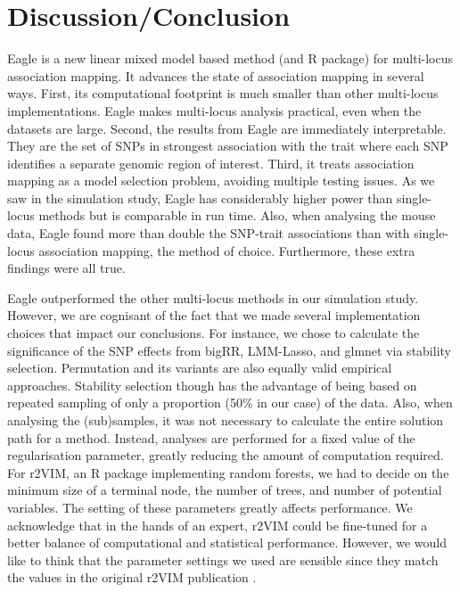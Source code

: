 \documentclass{article}
\begin{document}
\section{Discussion/Conclusion}
Eagle is a new linear mixed model based method (and R package) for multi-locus association mapping. It advances the state of association mapping in several ways. 
First, its computational footprint is much smaller than other multi-locus implementations. Eagle makes multi-locus analysis 
practical, even when the datasets are large. Second, the results from
 Eagle are immediately interpretable. They are the set of SNPs in strongest association with the trait where 
each SNP identifies a separate genomic region of interest. Third, it treats association mapping as a model selection problem, avoiding 
 multiple testing issues. 
 As we saw in the simulation study, Eagle has considerably higher power than single-locus methods but is comparable in run time.
Also, when analysing the mouse data, Eagle found more than double the SNP-trait associations than 
with single-locus association mapping, the method of choice. Furthermore, these extra findings were all true. 

Eagle outperformed the other multi-locus methods in our simulation study. However, we are cognisant of the fact  that we made several implementation 
choices that impact our conclusions.  For instance, we chose to calculate the significance of the 
SNP effects from bigRR, LMM-Lasso, and glmnet via stability selection.  Permutation and its variants \citep{ browning2008presto,pahl2010permory} are also equally valid empirical approaches. Stability selection though has the advantage of being based on repeated sampling of only a proportion (50\% in our case) of the 
data. Also, when analysing the (sub)samples, it was not necessary to calculate the entire solution path for a method. 
 Instead,  analyses are 
performed for a fixed value of the regularisation parameter, greatly reducing the amount of computation required. For r2VIM, an R package 
implementing random forests, we had to decide on the  minimum size of a terminal node, the number of trees, and number of potential variables. 
The setting of these parameters greatly affects performance.  We  acknowledge that in the hands of an expert, 
r2VIM could be fine-tuned for a better balance of computational and statistical performance. 
However, we would like to think that the parameter settings we used are sensible 
since they match the values in the original r2VIM publication \citep{szymczak2016r2vim}.
\end{document}
